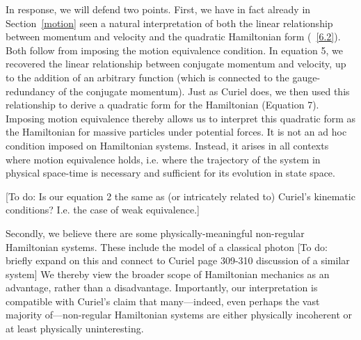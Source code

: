 \documentclass[letterpaper]{article}
\begin{document}
In response, we will defend two points. First, we have in fact already in Section~\ref{motion} seen a natural interpretation of both the linear relationship between momentum and velocity and the quadratic Hamiltonian form (~\ref{6.2}). Both follow from imposing the motion equivalence condition. In equation 5, we recovered the linear relationship between conjugate momentum and velocity, up to the addition of an arbitrary function (which is connected to the gauge-redundancy of the conjugate momentum). Just as Curiel does, we then used this relationship to derive a quadratic form for the Hamiltonian (Equation 7). Imposing motion equivalence thereby allows us to interpret this quadratic form as the Hamiltonian for massive particles under potential forces. It is not an ad hoc condition imposed on Hamiltonian systems. Instead, it arises in all contexts where motion equivalence holds, i.e. where the trajectory of the system in physical space-time is necessary and sufficient for its evolution in state space.

[To do: Is our equation 2 the same as (or intricately related to) Curiel's kinematic conditions? I.e. the case of weak equivalence.]


Secondly, we believe there are some physically-meaningful non-regular Hamiltonian systems. These include the model of a classical photon [To do: briefly expand on this and connect to Curiel page 309-310 discussion of a similar system] We thereby view the broader scope of Hamiltonian mechanics as an advantage, rather than a disadvantage. Importantly, our interpretation is compatible with Curiel's claim that many---indeed, even perhaps the vast majority of---non-regular Hamiltonian systems are either physically incoherent or at least physically uninteresting.

\end{document}
